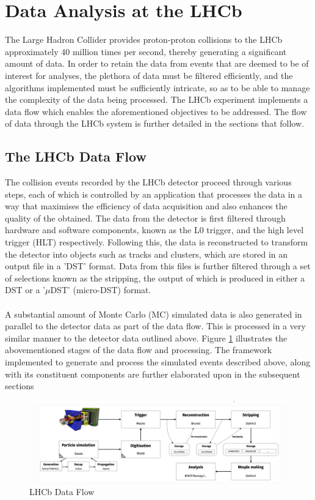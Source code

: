 \section{Data Analysis at the LHCb}
The Large Hadron Collider provides proton-proton collisions to the LHCb approximately 40 million times per second, thereby generating a significant amount of data. In order to retain the data from events that are deemed to be of interest for analyses, the plethora of data must be filtered efficiently, and the algorithms
implemented must be sufficiently intricate, so as to be able to manage the complexity of the data being processed. The LHCb experiment implements a data flow which enables the aforementioned objectives to be addressed. The flow of data through the LHCb system is further detailed in the sections that follow.
\subsection{The LHCb Data Flow}\label{LHCbDataFlow}
The collision events recorded by the LHCb detector proceed through various steps, each of which is controlled by an application that processes the data in a way that maximises the efficiency of data acquisition and also enhances the quality of the obtained. The data from the detector is first filtered through hardware and software components, known as the L0 trigger, and the high level trigger (HLT) respectively. Following this, the data is
reconstructed to transform the detector into objects such as tracks and clusters, which are stored in an output file in a 'DST' format. Data from this files is further filtered through a set of selections known as the stripping, the output of which is produced in either a DST or a '$\mu$DST' (micro-DST) format.\\
\\
A substantial amount of Monte Carlo (MC) simulated data is also generated in parallel to the detector data as part of the data flow. This is processed in a very similar manner to the detector data outlined above. Figure \ref{LHCbData} illustrates the abovementioned stages of the data flow and processing. The framework implemented to generate and process the simulated events described above, along with its constituent components are further elaborated upon in the subsequent sections
\begin{figure}[H]
    \centering
    \includegraphics[scale = 0.4]{LHCbDataFlow.jpg}
    \caption{LHCb Data Flow}
    \label{LHCbData}
\end{figure}
